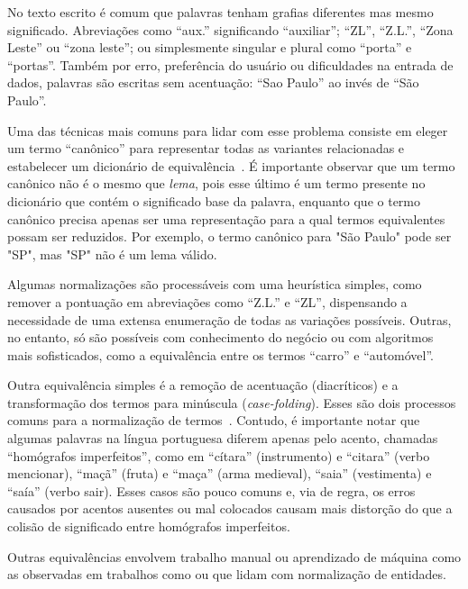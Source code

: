 \documentclass[12pt,a4paper]{article}
\begin{document}
No texto escrito é comum que palavras tenham grafias diferentes mas mesmo significado. Abreviações como \enquote{aux.} significando \enquote{auxiliar}; \enquote{ZL}, \enquote{Z.L.}, \enquote{Zona Leste} ou \enquote{zona leste}; ou simplesmente singular e plural como \enquote{porta} e \enquote{portas}. Também por erro, preferência do usuário ou dificuldades na entrada de dados, palavras são escritas sem acentuação: \enquote{Sao Paulo} ao invés de \enquote{São Paulo}.

Uma das técnicas mais comuns para lidar com esse problema consiste em eleger um termo \enquote{canônico} para representar todas as variantes relacionadas e estabelecer um dicionário de equivalência~\cite{Manning2008-fw}. É importante observar que um termo canônico não é o mesmo que \textit{lema}, pois esse último é um termo presente no dicionário que contém o significado base da palavra, enquanto que o termo canônico precisa apenas ser uma representação para a qual termos equivalentes possam ser reduzidos. Por exemplo, o termo canônico para "São Paulo" pode ser "SP", mas "SP" não é um lema válido.

Algumas normalizações são processáveis com uma heurística simples, como remover a pontuação em abreviações como \enquote{Z.L.} e \enquote{ZL}, dispensando a necessidade de uma extensa enumeração de todas as variações possíveis. Outras, no entanto, só são possíveis com conhecimento do negócio ou com algoritmos mais sofisticados, como a equivalência entre os termos \enquote{carro} e \enquote{automóvel}.

Outra equivalência simples é a remoção de acentuação (diacríticos) e a transformação dos termos para minúscula (\textit{case-folding}). Esses são dois processos comuns para a normalização de termos~\cite{Manning2008-fw}. Contudo, é importante notar que algumas palavras na língua portuguesa diferem apenas pelo acento, chamadas \enquote{homógrafos imperfeitos}, como em \enquote{cítara} (instrumento) e \enquote{citara} (verbo mencionar), \enquote{maçã} (fruta) e \enquote{maça} (arma medieval), \enquote{saia} (vestimenta) e \enquote{saía} (verbo sair). Esses casos são pouco comuns e, via de regra, os erros causados por acentos ausentes ou mal colocados causam mais distorção do que a colisão de significado entre homógrafos imperfeitos.

Outras equivalências envolvem trabalho manual ou aprendizado de máquina como as observadas em trabalhos como  ou  que lidam com normalização de entidades.
\end{document}

